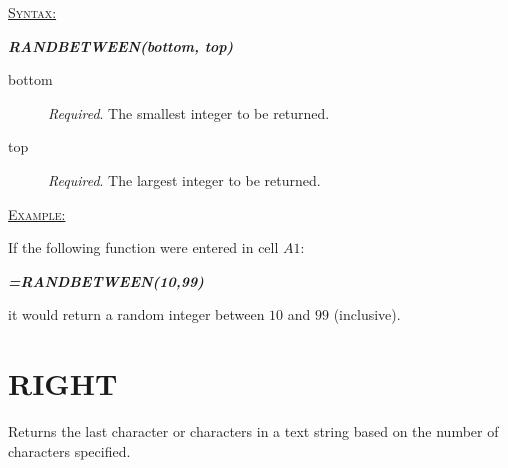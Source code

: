 \begin{addmargin}[1cm]{0cm}
	
	\medskip
	\underline{\textsc{Syntax:}}
	\medskip
	
	{\color{Syntax}
		\noindent\textbf{\textit{RANDBETWEEN(bottom, top)}}
	}
	
	\begin{description}
		\item[bottom] \textit{Required}. The smallest integer to be returned.
		\item[top] \textit{Required}. The largest integer to be returned.
	\end{description}

	\medskip
	\noindent\underline{\textsc{Example:}}
	\medskip
	
	\noindent If the following function were entered in cell $ A1 $:
	
	{\color{Syntax}
		\textit{\textbf{=RANDBETWEEN(10,99)}}
	}
	
	\noindent it would return a random integer between $ 10 $ and $ 99 $ (inclusive).

\end{addmargin}

\section{RIGHT}

Returns the last character or characters in a text string based on the number of characters specified.

